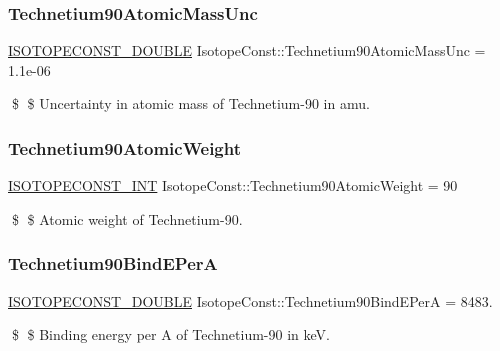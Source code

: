 \subsubsection{\texorpdfstring{Technetium90\+Atomic\+Mass\+Unc}{Technetium90AtomicMassUnc}}
{\footnotesize\ttfamily \mbox{\hyperlink{group___isotope_const-_macros_ga8f45a7272ce02c0b4c65c44636ed719a}{I\+S\+O\+T\+O\+P\+E\+C\+O\+N\+S\+T\+\_\+\+D\+O\+U\+B\+LE}} Isotope\+Const\+::\+Technetium90\+Atomic\+Mass\+Unc = 1.\+1e-\/06}

\$ \$ Uncertainty in atomic mass of Technetium-\/90 in amu. \mbox{\label{group___isotope_const-_technetium-_tc90_ga2565b2201db2ebb36afb4bbcd70959c4}} 
\subsubsection{\texorpdfstring{Technetium90\+Atomic\+Weight}{Technetium90AtomicWeight}}
{\footnotesize\ttfamily \mbox{\hyperlink{group___isotope_const-_macros_ga5f18360b3e99483a35c32d789e62621c}{I\+S\+O\+T\+O\+P\+E\+C\+O\+N\+S\+T\+\_\+\+I\+NT}} Isotope\+Const\+::\+Technetium90\+Atomic\+Weight = 90}

\$ \$ Atomic weight of Technetium-\/90. \mbox{\label{group___isotope_const-_technetium-_tc90_ga079be68333310d7f466645eb29b10a20}} 
\subsubsection{\texorpdfstring{Technetium90\+Bind\+E\+PerA}{Technetium90BindEPerA}}
{\footnotesize\ttfamily \mbox{\hyperlink{group___isotope_const-_macros_ga8f45a7272ce02c0b4c65c44636ed719a}{I\+S\+O\+T\+O\+P\+E\+C\+O\+N\+S\+T\+\_\+\+D\+O\+U\+B\+LE}} Isotope\+Const\+::\+Technetium90\+Bind\+E\+PerA = 8483.}

\$ \$ Binding energy per A of Technetium-\/90 in keV. \mbox{\label{group___isotope_const-_technetium-_tc90_ga72d9427e35adfda06dbeabb0c5d7988a}} 
